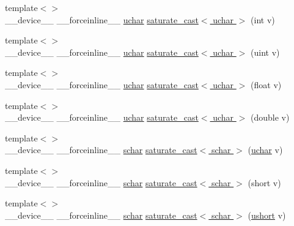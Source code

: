 \begin{DoxyCompactItemize}
\item 
{\footnotesize template$<$$>$ }\\\-\_\-\-\_\-device\-\_\-\-\_\- \-\_\-\-\_\-forceinline\-\_\-\-\_\- \hyperlink{core_2types__c_8h_a65f85814a8290f9797005d3b28e7e5fc}{uchar} \hyperlink{namespacecv_1_1gpu_1_1device_a6c050dfb0c04d528db3d7c4a259e07b5}{saturate\-\_\-cast$<$ uchar $>$} (int v)
\item 
{\footnotesize template$<$$>$ }\\\-\_\-\-\_\-device\-\_\-\-\_\- \-\_\-\-\_\-forceinline\-\_\-\-\_\- \hyperlink{core_2types__c_8h_a65f85814a8290f9797005d3b28e7e5fc}{uchar} \hyperlink{namespacecv_1_1gpu_1_1device_a2f24583284591a9a3fa0a9577e424c88}{saturate\-\_\-cast$<$ uchar $>$} (uint v)
\item 
{\footnotesize template$<$$>$ }\\\-\_\-\-\_\-device\-\_\-\-\_\- \-\_\-\-\_\-forceinline\-\_\-\-\_\- \hyperlink{core_2types__c_8h_a65f85814a8290f9797005d3b28e7e5fc}{uchar} \hyperlink{namespacecv_1_1gpu_1_1device_a12e2524e7d0cbd4de6b80a574a5ca387}{saturate\-\_\-cast$<$ uchar $>$} (float v)
\item 
{\footnotesize template$<$$>$ }\\\-\_\-\-\_\-device\-\_\-\-\_\- \-\_\-\-\_\-forceinline\-\_\-\-\_\- \hyperlink{core_2types__c_8h_a65f85814a8290f9797005d3b28e7e5fc}{uchar} \hyperlink{namespacecv_1_1gpu_1_1device_adcac4843cf0fb882cec99139b5286ca1}{saturate\-\_\-cast$<$ uchar $>$} (double v)
\item 
{\footnotesize template$<$$>$ }\\\-\_\-\-\_\-device\-\_\-\-\_\- \-\_\-\-\_\-forceinline\-\_\-\-\_\- \hyperlink{core_2types__c_8h_a0fd9ce9d735064461bebfe6037026093}{schar} \hyperlink{namespacecv_1_1gpu_1_1device_af1619f1690fffd27726eab3cc17312e5}{saturate\-\_\-cast$<$ schar $>$} (\hyperlink{core_2types__c_8h_a65f85814a8290f9797005d3b28e7e5fc}{uchar} v)
\item 
{\footnotesize template$<$$>$ }\\\-\_\-\-\_\-device\-\_\-\-\_\- \-\_\-\-\_\-forceinline\-\_\-\-\_\- \hyperlink{core_2types__c_8h_a0fd9ce9d735064461bebfe6037026093}{schar} \hyperlink{namespacecv_1_1gpu_1_1device_a7981352b36d22537e3b5c7def1488d7e}{saturate\-\_\-cast$<$ schar $>$} (short v)
\item 
{\footnotesize template$<$$>$ }\\\-\_\-\-\_\-device\-\_\-\-\_\- \-\_\-\-\_\-forceinline\-\_\-\-\_\- \hyperlink{core_2types__c_8h_a0fd9ce9d735064461bebfe6037026093}{schar} \hyperlink{namespacecv_1_1gpu_1_1device_a3361426521e66cd71135842b8036c2f8}{saturate\-\_\-cast$<$ schar $>$} (\hyperlink{core_2types__c_8h_ab95f123a6c9bcfee6a343170ef8c5f69}{ushort} v)

\end{DoxyCompactItemize}
